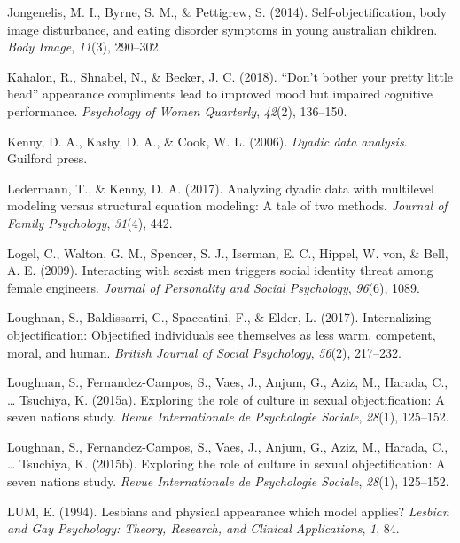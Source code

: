 \documentclass[man]{apa6}
\begin{document}
\hypertarget{ref-jongenelis2014}{}
Jongenelis, M. I., Byrne, S. M., \& Pettigrew, S. (2014).
Self-objectification, body image disturbance, and eating disorder
symptoms in young australian children. \emph{Body Image}, \emph{11}(3),
290--302.

\hypertarget{ref-kahalon2018don}{}
Kahalon, R., Shnabel, N., \& Becker, J. C. (2018). ``Don't bother your
pretty little head'' appearance compliments lead to improved mood but
impaired cognitive performance. \emph{Psychology of Women Quarterly},
\emph{42}(2), 136--150.

\hypertarget{ref-kenny2006dyadic}{}
Kenny, D. A., Kashy, D. A., \& Cook, W. L. (2006). \emph{Dyadic data
analysis}. Guilford press.

\hypertarget{ref-ledermann2017analyzing}{}
Ledermann, T., \& Kenny, D. A. (2017). Analyzing dyadic data with
multilevel modeling versus structural equation modeling: A tale of two
methods. \emph{Journal of Family Psychology}, \emph{31}(4), 442.

\hypertarget{ref-logel2009interacting}{}
Logel, C., Walton, G. M., Spencer, S. J., Iserman, E. C., Hippel, W.
von, \& Bell, A. E. (2009). Interacting with sexist men triggers social
identity threat among female engineers. \emph{Journal of Personality and
Social Psychology}, \emph{96}(6), 1089.

\hypertarget{ref-loughnan2017internalizing}{}
Loughnan, S., Baldissarri, C., Spaccatini, F., \& Elder, L. (2017).
Internalizing objectification: Objectified individuals see themselves as
less warm, competent, moral, and human. \emph{British Journal of Social
Psychology}, \emph{56}(2), 217--232.

\hypertarget{ref-loughnan2015exploring}{}
Loughnan, S., Fernandez-Campos, S., Vaes, J., Anjum, G., Aziz, M.,
Harada, C., \ldots{} Tsuchiya, K. (2015a). Exploring the role of culture
in sexual objectification: A seven nations study. \emph{Revue
Internationale de Psychologie Sociale}, \emph{28}(1), 125--152.

\hypertarget{ref-loughnan2015}{}
Loughnan, S., Fernandez-Campos, S., Vaes, J., Anjum, G., Aziz, M.,
Harada, C., \ldots{} Tsuchiya, K. (2015b). Exploring the role of culture
in sexual objectification: A seven nations study. \emph{Revue
Internationale de Psychologie Sociale}, \emph{28}(1), 125--152.

\hypertarget{ref-lum1994lesbians}{}
LUM, E. (1994). Lesbians and physical appearance which model applies?
\emph{Lesbian and Gay Psychology: Theory, Research, and Clinical
Applications}, \emph{1}, 84.
\end{document}

